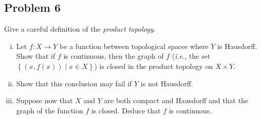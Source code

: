 \documentclass[12pt]{article}
\newcommand{\ita}[1]{\textit{#1}}
\newcommand\setb[1]{\left \{ #1 \right \}}
\theoremstyle{definition}
\begin{document}
\subsection{Problem 6 \texorpdfstring{\cite{Munkres}}{}}
Give a careful definition of the \ita{product topology}.
\begin{enumerate}[(i)]
    \item Let $f : X \to Y$ be a function between topological spaces where $Y$ is Hausdorff. Show that if $f$ is continuous, then the graph of $f$ (\ita{i.e.}, the set $\setb{ (x,f(x)) \mid x \in X }$) is closed in the product topology on $X \times Y$.
    \item Show that this conclusion may fail if $Y$ is not Hausdorff.
    \item Suppose now that $X$ and $Y$ are both compact and Hausdorff and that the graph of the function $f$ is closed. Deduce that $f$ is continuous.
\end{enumerate}
\end{document}
